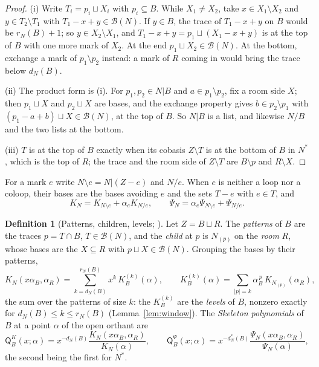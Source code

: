 \documentclass[11pt]{article}
\theoremstyle{plain}
\theoremstyle{definition}
\newtheorem{defn}[prop]{Definition}
\theoremstyle{remark}
\newcommand{\cB}{\mathcal B}
\newcommand{\sQ}{\mathsf Q}
\begin{document}
\begin{proof}
(i) Write $T_i=p_i\sqcup X_i$ with $p_i\subseteq B$. While $X_1\neq X_2$, take $x\in X_1\setminus X_2$ and $y\in T_2\setminus T_1$ with $T_1-x+y\in\cB(N)$. If $y\in B$, the trace of $T_1-x+y$ on $B$ would be $r_N(B)+1$; so $y\in X_2\setminus X_1$, and $T_1-x+y=p_1\sqcup(X_1-x+y)$ is at the top of $B$ with one more mark of $X_2$. At the end $p_1\sqcup X_2\in\cB(N)$. At the bottom, exchange a mark of $p_1\setminus p_2$ instead: a mark of $R$ coming in would bring the trace below $d_N(B)$.

(ii) The product form is (i). For $p_1,p_2\in N|B$ and $a\in p_1\setminus p_2$, fix a room side $X$; then $p_1\sqcup X$ and $p_2\sqcup X$ are bases, and the exchange property gives $b\in p_2\setminus p_1$ with $(p_1-a+b)\sqcup X\in\cB(N)$, at the top of $B$. So $N|B$ is a list, and likewise $N/B$ and the two lists at the bottom.

(iii) $T$ is at the top of $B$ exactly when its cobasis $Z\setminus T$ is at the bottom of $B$ in $N^\ast$, which is the top of $R$; the trace and the room side of $Z\setminus T$ are $B\setminus p$ and $R\setminus X$.
\end{proof}

For a mark $e$ write $N\setminus e=N|(Z-e)$ and $N/e$. When $e$ is neither a loop nor a coloop, their bases are the bases avoiding $e$ and the sets $T-e$ with $e\in T$, and \cite[Def.~7.3, p.~48]{F}
\[
K_N=K_{N\setminus e}+\alpha_eK_{N/e},\qquad \Psi_N=\alpha_e\Psi_{N\setminus e}+\Psi_{N/e}.
\]

\begin{defn}[Patterns, children, levels; {\cite[Def.~12.1, p.~70; Def.~12.9, p.~71; Def.~12.15, p.~73]{F}}]\label{def:children}
Let $Z=B\sqcup R$. The \emph{patterns} of $B$ are the traces $p=T\cap B$, $T\in\cB(N)$, and the \emph{child} at $p$ is $N_{(p)}$ on the \emph{room} $R$, whose bases are the $X\subseteq R$ with $p\sqcup X\in\cB(N)$. Grouping the bases by their patterns,
\[
K_N(x\alpha_B,\alpha_R)=\sum_{k=d_N(B)}^{r_N(B)}x^k\,K^{(k)}_B(\alpha),\qquad K^{(k)}_B(\alpha)=\sum_{|p|=k}\alpha_B^{\,p}\,K_{N_{(p)}}(\alpha_R),
\]
the sum over the patterns of size $k$: the $K^{(k)}_B$ are the \emph{levels} of $B$, nonzero exactly for $d_N(B)\le k\le r_N(B)$ (Lemma~\ref{lem:window}). The \emph{Skeleton polynomials} of $B$ at a point $\alpha$ of the open orthant are
\[
\sQ^K_B(x;\alpha)=x^{-d_N(B)}\frac{K_N(x\alpha_B,\alpha_R)}{K_N(\alpha)},\qquad \sQ^\Psi_B(x;\alpha)=x^{-d^\ast_N(B)}\frac{\Psi_N(x\alpha_B,\alpha_R)}{\Psi_N(\alpha)},
\]
the second being the first for $N^\ast$.
\end{defn}
\end{document}
